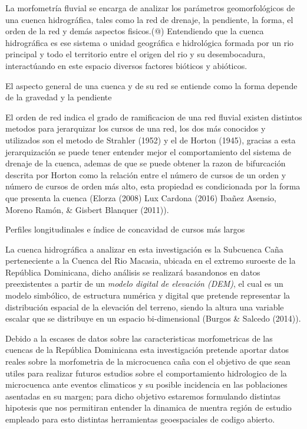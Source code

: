 \documentclass[11pt,]{article}
\begin{document}
La morfometría fluvial se encarga de analizar los parámetros
geomorfológicos de una cuenca hidrográfica, tales como la red de
drenaje, la pendiente, la forma, el orden de la red y demás aspectos
fisicos.(@) Entendiendo que la cuenca hidrográfica es ese sistema o
unidad geográfica e hidrológica formada por un rio principal y todo el
territorio entre el origen del rio y su desembocadura, interactúando en
este espacio diversos factores bióticos y abióticos.

El aspecto general de una cuenca y de su red se entiende como la forma
depende de la gravedad y la pendiente

El orden de red indica el grado de ramificacion de una red fluvial
existen distintos metodos para jerarquizar los cursos de una red, los
dos más conocidos y utilizados son el metodo de Strahler (1952) y el de
Horton (1945), gracias a esta jerarquización se puede tener entender
mejor el comportamiento del sistema de drenaje de la cuenca, ademas de
que se puede obtener la razon de bifurcación descrita por Horton como la
relación entre el número de cursos de un orden y número de cursos de
orden más alto, esta propiedad es condicionada por la forma que presenta
la cuenca (Elorza (2008) Lux Cardona (2016) Ibañez Asensio, Moreno
Ramón, \& Gisbert Blanquer (2011)).

Perfiles longitudinales e índice de concavidad de cursos más largos

La cuenca hidrográfica a analizar en esta investigación es la Subcuenca
Caña perteneciente a la Cuenca del Rio Macasia, ubicada en el extremo
suroeste de la República Dominicana, dicho análisis se realizará
basandonos en datos preexistentes a partir de un \emph{modelo digital de
elevación (DEM)}, el cual es un modelo simbólico, de estructura numérica
y digital que pretende representar la distribución espacial de la
elevación del terreno, siendo la altura una variable escalar que se
distribuye en un espacio bi-dimensional (Burgos \& Salcedo (2014)).

Debido a la escases de datos sobre las caracteristicas morfometricas de
las cuencas de la República Dominicana esta investigación pretende
aportar datos reales sobre la morfometria de la microcuenca caña con el
objetivo de que sean utiles para realizar futuros estudios sobre el
comportamiento hidrologico de la microcuenca ante eventos climaticos y
su posible incidencia en las poblaciones asentadas en su margen; para
dicho objetivo estaremos formulando distintas hipotesis que nos
permitiran entender la dinamica de nuentra región de estudio empleado
para esto distintas herramientas geoespaciales de codigo abierto.
\end{document}
